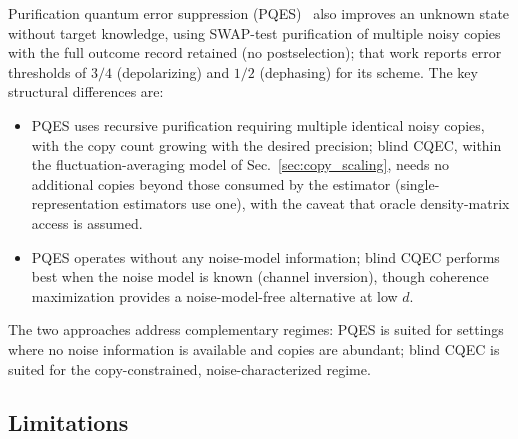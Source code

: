 \documentclass[pra,twocolumn,superscriptaddress,longbibliography,floatfix,nofootinbib]{revtex4-2}
\begin{document}
Purification quantum error suppression (PQES)~\cite{Raghoonanan2026} also improves an unknown state without target knowledge, using SWAP-test purification of multiple noisy copies with the full outcome record retained (no postselection); that work reports error thresholds of $3/4$ (depolarizing) and $1/2$ (dephasing) for its scheme.
The key structural differences are:
\begin{itemize}
\item PQES uses recursive purification requiring multiple identical noisy copies, with the copy count growing with the desired precision;
blind CQEC, within the fluctuation-averaging model of Sec.~\ref{sec:copy_scaling}, needs no additional copies beyond those consumed by the estimator (single-representation estimators use one), with the caveat that oracle density-matrix access is assumed.
\item PQES operates without any noise-model information;
blind CQEC performs best when the noise model is known (channel inversion), though coherence maximization provides a noise-model-free alternative at low $d$.
\end{itemize}
The two approaches address complementary regimes: PQES is suited for settings where no noise information is available and copies are abundant; blind CQEC is suited for the copy-constrained, noise-characterized regime.


\subsection{Limitations}
\label{sec:limitations}
\end{document}
